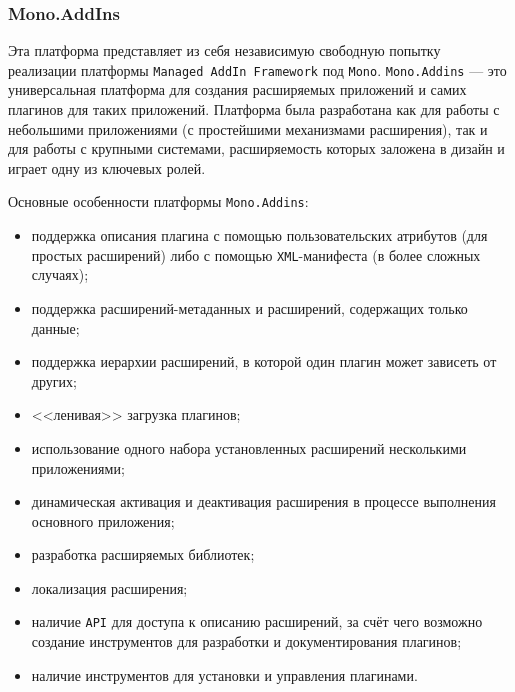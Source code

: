 \subsubsection{Mono.AddIns}

Эта платформа представляет из себя независимую свободную попытку реализации платформы {\tt Managed AddIn Framework} под {\tt Mono}.
{\tt Mono.Addins} --- это универсальная платформа для создания расширяемых приложений и самих плагинов для таких приложений. Платформа была разработана  как для работы с небольшими приложениями (с простейшими механизмами расширения), так и для работы с крупными системами, расширяемость которых заложена в дизайн и играет одну из ключевых ролей.

Основные особенности платформы {\tt Mono.Addins}:
\begin{itemize}
  \item поддержка описания плагина с помощью пользовательских атрибутов (для простых расширений) либо с помощью {\tt XML}-манифеста (в более сложных случаях);
  \item поддержка расширений-метаданных и расширений, содержащих только данные;
  \item поддержка иерархии расширений, в которой один плагин может зависеть от других;
  \item <<ленивая>> загрузка плагинов;
  \item использование одного набора установленных расширений несколькими приложениями;
  \item динамическая активация и деактивация расширения в процессе выполнения основного приложения;
  \item разработка расширяемых библиотек;
  \item локализация расширения;
  \item наличие {\tt API} для доступа к описанию расширений, за счёт чего возможно создание инструментов для разработки и документирования плагинов;
  \item наличие инструментов для установки и управления плагинами.
\end{itemize}
